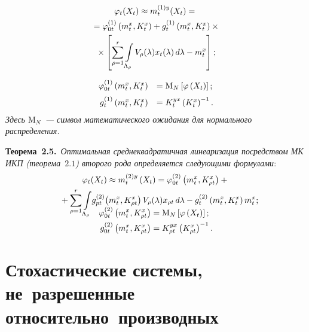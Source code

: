 \begin{multicols}{2}
\noindent
\begin{multline*}
\varphi_t (X_t) \approx m_t^{(1)y} (X_t) = {}\\
{}=\varphi_{0t}^{(1)} \left(m_t^x, K_t^x\right) + 
g_t^{(1)} \left(m_t^x, K_t^x\right)\times{}\\
{}\times \lk \sss_{\rho=1}^r \int\limits_{\Lambda_\rho} V_\rho (\la) 
x_t (\la) \,d\la-m_t^x\rk; %
\end{multline*}

\vspace*{-6pt}

\noindent
\begin{equation*}
\begin{array}{rl}
\varphi_{0t}^{(1)} \left(m_t^x, K_t^x\right) &= \mathrm{M}_N \left[ \varphi \left(X_t\right)\right];\\[6pt]
g_{t}^{(1)} \left(m_t^x, K_t^x\right)& = K_t^{yx}\left(K_t^x\right)^{-1}.
\end{array}
\end{equation*}
\textit{Здесь $\mathrm{M}_N$~--- символ математического ожидания для нормального распределения.}

\smallskip

\noindent
\textbf{Теорема~2.5.}\ \textit{Оптимальная среднеквадратичная линеаризация посредством МК ИКП (теорема~$2.1$) 
второго рода определяется следующими формулами}:
  \begin{multline*}
  \varphi_t (X_t) \approx m_t^{(2)y} \left(X_t\right) = \varphi_{0t}^{(2)} \left(m_t^x, K_{\rho t}^x\right) +{}\\
{}+\sss_{\rho=1}^r \int\limits_{\Lambda_\rho} \!g_{pt}^{(2)} \! \left(m_t^x, K_{\rho t}^x\right) 
V_\rho (\la) x_{\rho t} \,d\la - g_t^{(2)}  \left(m_t^x, K_t^x\right) m_t^x;\hspace*{-7.8623pt}\\[-25pt] %
\end{multline*}

\pagebreak

\noindent
  \begin{align*}
  \varphi_{0t}^{(2)}  \left(m_t^x, K_{\rho t}^x\right) &=\mathrm{M}_N \left[ \varphi \left(X_t\right)\right];\\
g_{0t}^{(2)}  \left(m_t^x, K_{\rho t}^x\right) &=K_{\rho t}^{yx} \left(K_{\rho t}^x\right)^{- 1}.
\end{align*}


\section{Стохастические системы, не~разрешенные относительно~производных}



\end{multicols}
